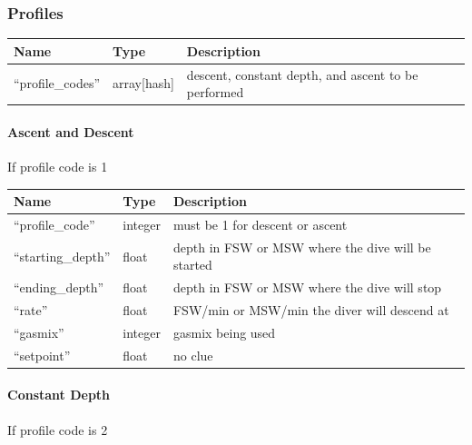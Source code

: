 \documentclass[12pt]{article}
\begin{document}
\subsubsection{Profiles}
\begin{longtable}{|l|l|p{5cm}|}
\hline
 Name                &  Type         &  Description                                          \\
\hline
 ``profile\_codes''  &  array[hash]  &  descent, constant depth, and ascent to be performed  \\
\hline
\end{longtable}

\paragraph{Ascent and Descent}

If profile code is 1

\begin{longtable}{|l|l|p{5cm}|}
\hline
 Name                 &  Type     &  Description                                         \\
\hline
 ``profile\_code''    &  integer  &  must be 1 for descent or ascent                               \\
\hline
 ``starting\_depth''  &  float    &  depth in FSW or MSW where the dive will be started  \\
\hline
 ``ending\_depth''    &  float    &  depth in FSW or MSW where the dive will stop        \\
\hline
 ``rate''             &  float    &  FSW/min or MSW/min the diver will descend at        \\
\hline
 ``gasmix''           &  integer  &  gasmix being used                                   \\
\hline
 ``setpoint''         &  float    &  no clue                                             \\
\hline
\end{longtable}

\paragraph{Constant Depth}

If profile code is 2
\end{document}
